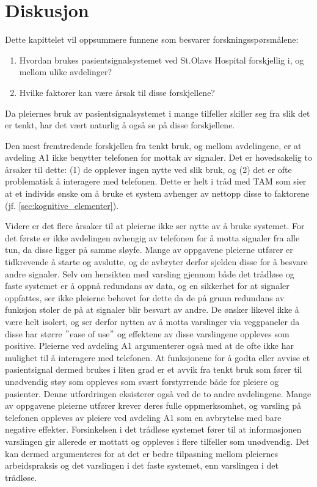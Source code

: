 \chapter{Diskusjon}
\label{chp:diskusjon_rq}
Dette kapittelet vil oppsummere funnene som besvarer forskningsspørsmålene:

\begin{enumerate}
\item Hvordan brukes pasientsignalsystemet ved St.Olavs Hospital forskjellig i, og mellom ulike avdelinger? 
\item Hvilke faktorer kan være årsak til disse forskjellene?
\end{enumerate}

\noindent
Da pleiernes bruk av pasientsignalsystemet i mange tilfeller skiller seg fra slik det er tenkt, har det vært naturlig å også se på disse forskjellene.

\noindent
Den mest fremtredende forskjellen fra tenkt bruk, og mellom avdelingene, er at avdeling A1 ikke benytter telefonen for mottak av signaler. Det er hovedsakelig to årsaker til dette: (1) de opplever ingen nytte ved slik bruk, og (2) det er ofte problematisk å interagere med telefonen. Dette er helt i tråd med TAM som sier at et individs ønske om å bruke et system avhenger av nettopp disse to faktorene (jf. \ref{sec:kognitive_elementer}). 

\noindent
Videre er det flere årsaker til at pleierne ikke ser nytte av å bruke systemet. For det første er ikke avdelingen avhengig av telefonen for å motta signaler fra alle tun, da disse ligger på samme sløyfe. Mange av oppgavene pleierne utfører er tidkrevende å starte og avslutte, og de avbryter derfor sjelden disse for å besvare andre signaler. Selv om hensikten med varsling gjennom både det trådløse og faste systemet er å oppnå redundans av data, og en sikkerhet for at signaler oppfattes, ser ikke pleierne behovet for dette da de på grunn redundans av funksjon stoler de på at signaler blir besvart av andre. De ønsker likevel ikke å være helt isolert, og ser derfor nytten av å motta varslinger via veggpaneler da disse har større $"$ease of use$"$ og effektene av disse varslingene oppleves som positive. Pleierne ved avdeling A1 argumenterer også med at de ofte ikke har mulighet til å interagere med telefonen. At funksjonene for å godta eller avvise et pasientsignal dermed brukes i liten grad er et avvik fra tenkt bruk som fører til unødvendig støy som oppleves som svært forstyrrende både for pleiere og pasienter. Denne utfordringen eksisterer også ved de to andre avdelingene. Mange av oppgavene pleierne utfører krever deres fulle oppmerksomhet, og varsling på telefonen oppleves av pleiere ved avdeling A1 som en avbrytelse med bare negative effekter. Forsinkelsen i det trådløse systemet fører til at informasjonen varslingen gir allerede er mottatt og oppleves i flere tilfeller som unødvendig. Det kan dermed argumenteres for at det er bedre tilpasning mellom pleiernes arbeidspraksis og det varslingen i det faste systemet, enn varslingen i det trådløse.

